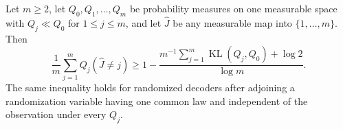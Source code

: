 Let \(m\geq2\), let \(Q_0,Q_1,\ldots,Q_m\) be probability measures on one measurable space with \(Q_j\ll Q_0\) for \(1\leq j\leq m\), and let \(\widehat J\) be any measurable map into \(\{1,\ldots,m\}\).  Then
\[
 \frac1m\sum_{j=1}^m Q_j(\widehat J\neq j)
 \geq 1-\frac{m^{-1}\sum_{j=1}^m\operatorname{KL}(Q_j,Q_0)+\log2}{\log m}.
\]
The same inequality holds for randomized decoders after adjoining a randomization variable having one common law and independent of the observation under every \(Q_j\).